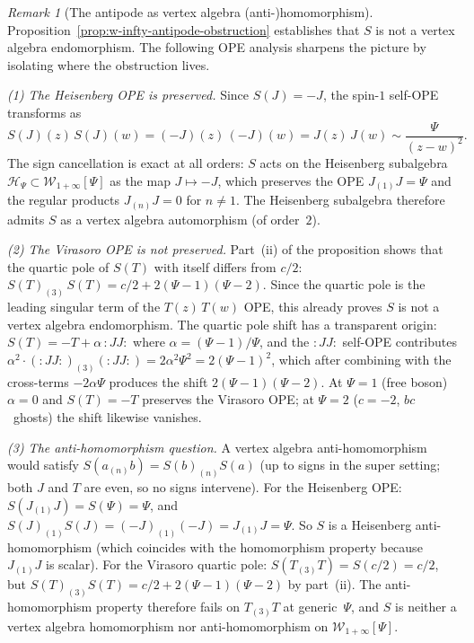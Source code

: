 \documentclass[11pt,reqno]{amsart}
\theoremstyle{definition}
\theoremstyle{remark}
\newtheorem{remark}[theorem]{Remark}
\newcommand{\cH}{\mathcal{H}}
\newcommand{\cW}{\mathcal{W}}
\numberwithin{equation}{section}
\begin{document}
\begin{remark}[The antipode as vertex algebra
(anti-)homomorphism]
\label{rem:antipode-ope-analysis}
Proposition~\ref{prop:w-infty-antipode-obstruction}
establishes that $S$ is not a vertex algebra endomorphism.
The following OPE analysis sharpens the picture by isolating
where the obstruction lives.

\smallskip
\noindent\emph{(1) The Heisenberg OPE is preserved.}
Since $S(J) = -J$, the spin-$1$ self-OPE transforms as
\[
  S(J)(z)\, S(J)(w)
  = (-J)(z)\,(-J)(w)
  = J(z)\, J(w)
  \sim \frac{\Psi}{(z-w)^2}.
\]
The sign cancellation is exact at all orders: $S$ acts on
the Heisenberg subalgebra $\cH_\Psi \subset
\cW_{1+\infty}[\Psi]$ as the map $J \mapsto -J$, which
preserves the OPE $J_{(1)}J = \Psi$ and the regular products
$J_{(n)}J = 0$ for $n \neq 1$.
The Heisenberg subalgebra therefore admits $S$ as a
vertex algebra automorphism (of order~$2$).

\smallskip
\noindent\emph{(2) The Virasoro OPE is not preserved.}
Part~(ii) of the proposition shows that the quartic pole
of $S(T)$ with itself differs from $c/2$:
$S(T)_{(3)}\, S(T) = c/2 + 2(\Psi-1)(\Psi-2)$.
Since the quartic pole is the leading singular term of the
$T(z)\, T(w)$ OPE, this already proves $S$ is not a vertex
algebra endomorphism.
The quartic pole shift has a transparent origin:
$S(T) = -T + \alpha\,{:}JJ{:}$ where $\alpha = (\Psi-1)/\Psi$,
and the ${:}JJ{:}$ self-OPE contributes
$\alpha^2 \cdot ({:}JJ{:})_{(3)}({:}JJ{:}) = 2\alpha^2 \Psi^2
= 2(\Psi-1)^2$, which after combining with the cross-terms
$-2\alpha\Psi$ produces the shift $2(\Psi-1)(\Psi-2)$.
At $\Psi = 1$ (free boson) $\alpha = 0$ and $S(T) = -T$
preserves the Virasoro OPE; at $\Psi = 2$ ($c = -2$,
$bc$~ghosts) the shift likewise vanishes.

\smallskip
\noindent\emph{(3) The anti-homomorphism question.}
A vertex algebra anti-homomorphism would satisfy
$S(a_{(n)} b) = S(b)_{(n)} S(a)$ (up to signs in the
super setting; both $J$ and $T$ are even, so no signs
intervene).
For the Heisenberg OPE:
$S(J_{(1)} J) = S(\Psi) = \Psi$, and
$S(J)_{(1)} S(J) = (-J)_{(1)}(-J) = J_{(1)} J = \Psi$.
So $S$ is a Heisenberg anti-homomorphism (which coincides
with the homomorphism property because $J_{(1)} J$ is
scalar).
For the Virasoro quartic pole:
$S(T_{(3)} T) = S(c/2) = c/2$, but
$S(T)_{(3)} S(T) = c/2 + 2(\Psi-1)(\Psi-2)$ by
part~(ii).
The anti-homomorphism property therefore fails on
$T_{(3)}T$ at generic~$\Psi$, and $S$ is
neither a vertex algebra homomorphism nor anti-homomorphism
on $\cW_{1+\infty}[\Psi]$.


\end{remark}
\end{document}
